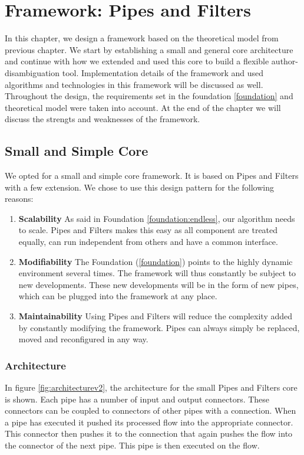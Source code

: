 \chapter{Framework: Pipes and Filters}
\label{newframework}

In this chapter, we design a framework based on the theoretical model from previous chapter. We start by establishing a small and general core architecture and continue with how we extended and used this core to build a flexible author-disambiguation tool. Implementation details of the framework and used algorithms and technologies in this framework will be discussed as well. Throughout the design, the requirements set in the foundation \autoref{foundation} and theoretical model were taken into account. At the end of the chapter we will discuss the strengts and weaknesses of the framework.

\section{Small and Simple Core}

We opted for a small and simple core framework. It is based on Pipes and Filters with a few extension. We chose to use this design pattern for the following reasons:

\begin{enumerate}
\item \textbf{Scalability} As said in Foundation \autoref{foundation:endless}, our algorithm needs to scale. Pipes and Filters makes this easy as all component are treated equally, can run independent from others and have a common interface.
\item \textbf{Modifiability} The Foundation (\autoref{foundation}) points to the highly dynamic environment several times. The framework will thus constantly be subject to new developments. These new developments will be in the form of new pipes, which can be plugged into the framework at any place.
\item \textbf{Maintainability} Using Pipes and Filters will reduce the complexity added by constantly modifying the framework. Pipes can always simply be replaced, moved and reconfigured in any way.
\end{enumerate}

\subsection{Architecture}

In figure \autoref{fig:architecturev2}, the architecture for the small Pipes and Filters core is shown. Each pipe has a number of input and output connectors. These connectors can be coupled to connectors of other pipes with a connection. When a pipe has executed it pushed its processed flow into the appropriate connector. This connector then pushes it to the connection that again pushes the flow into the connector of the next pipe. This pipe is then executed on the flow.

